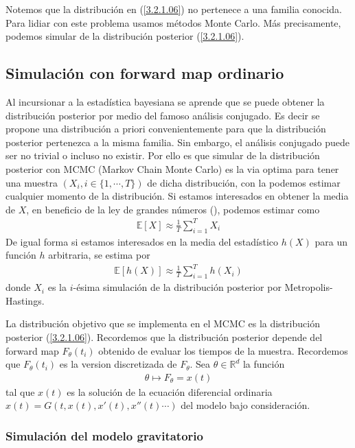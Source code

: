 Notemos que la distribución en (\ref{3.2.1.06}) no pertenece a una familia conocida. Para lidiar con este problema usamos métodos Monte Carlo. Más precisamente, podemos simular de la distribución posterior (\ref{3.2.1.06}).

\subsection{Simulación con forward map ordinario}

Al incursionar a la estadística bayesiana se aprende que se puede obtener la distribución posterior por medio del famoso análisis conjugado. Es decir se propone una distribución a priori convenientemente para que la distribución posterior pertenezca a la misma familia. Sin embargo, el análisis conjugado puede ser no trivial o incluso no existir. Por ello es que simular de la distribución posterior con MCMC (Markov Chain Monte Carlo) es la via optima para tener una muestra $(X_i, i \in \{1,\cdots, T\})$ de dicha distribución, con la podemos estimar cualquier momento de la distribución. Si estamos interesados en obtener la media de $X$, en beneficio de la ley de grandes números (\cite{van2000asymptotic}), podemos estimar como
\begin{align}
    \mathbb{E}\left [X\right ] \approx \frac{1}{T}\sum_{i = 1}^{T} X_i
\end{align}
De igual forma si estamos interesados en la media del estadístico $h(X)$ para un función $h$ arbitraria, se estima por
\begin{align}
    \mathbb{E}\left [h(X)\right ] \approx \frac{1}{T} \sum_{i=1}^{T} h(X_i)
    \label{3.2.2.01}
\end{align}
donde $X_i$ es la $i$-ésima simulación de la distribución posterior por Metropolis-Hastings.

La distribución objetivo que se implementa en el MCMC es la distribución posterior (\ref{3.2.1.06}). Recordemos que la distribución posterior depende del forward map $F_{\theta}(t_i)$ obtenido de evaluar los tiempos de la muestra. Recordemos que $F_{\theta}(t_i)$ es la version discretizada de $F_{\theta}$. Sea $\theta \in \mathbb{R}^d$ la función
\begin{align}
    \theta  \mapsto F_{\theta} = x(t) 
\end{align}
tal que $x(t)$ es la solución de la ecuación diferencial ordinaria $x(t) = G(t,x(t),x'(t),x''(t)\cdots)$ del modelo bajo consideración.

\subsubsection{Simulación del modelo gravitatorio}

